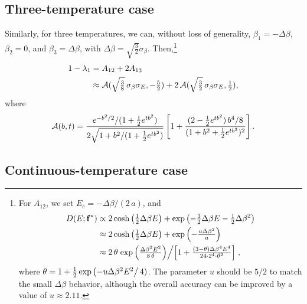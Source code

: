 \documentclass[reprint,aip,jcp,superscriptaddress]{revtex4-1}
\begin{document}
\subsection{Three-temperature case}



Similarly,
for three  temperatures,
we can, without loss of generality,
$\beta_1 = -\Delta \beta$,
$\beta_2 = 0$,
and
$\beta_3 = \Delta \beta$,
with
$\Delta \beta = \sqrt{\frac 3 2} \sigma_\beta$.
%
Then,\footnote{
%
For $A_{12}$,
we set $E_c = -\Delta \beta/(2 \, a)$,
and
\begin{align*}
D(E; \mathbf{f}^*)
&\propto
2 \cosh\left(
  \tfrac{1}{2} \Delta \beta E
\right)
+
\exp\left(
  -\tfrac{3}{2} \Delta \beta E
  -\tfrac{1}{2} \Delta \beta^2
\right)
\\
&\approx
2 \cosh\left(
  \tfrac{1}{2} \Delta \beta E
\right)
+
\exp\left(
  -\tfrac{ u \Delta \beta^2 }{ a }
\right)
\\
&\approx
2 \, \theta
\left.
  \exp\left(
    \tfrac{\Delta \beta^2 E^2} { 8 \, \theta }
  \right)
\middle/
  \left[
    1
    +
    \tfrac{ (3 - \theta) \Delta \beta^4 E^4 }
    { 24 \cdot 2^4 \cdot \theta^2 }
  \right]
\right.,
\end{align*}
where
$\theta = 1 + \frac 1 2 \exp\left(-u \Delta \beta^2 E^2\right/4)$.
%
The parameter $u$ should be $5/2$
to match the small $\Delta \beta$ behavior,
although the overall accuracy can be improved
by a value of $u \approx 2.11$.
}
%
\begin{align}
1 - \lambda_1
&= A_{12} + 2 A_{13}
\notag \\
&\approx
\mathcal{A}(\sqrt{\tfrac 3 8} \, \sigma_\beta \sigma_E, -\tfrac 5 2)
+
2 \, \mathcal{A}(\sqrt{\tfrac 3 2} \, \sigma_\beta \sigma_E, \tfrac 1 2),
\label{eq:lambda1_threeT}
\end{align}
where
\begin{align*}
\mathcal{A}(b, t)
=
\frac{
  e^{-b^2/2} / (1 + \frac{1}{2}e^{tb^2})
}
{
  2 \sqrt{1 + b^2/(1 + \frac{1}{2} e^{tb^2})}
}
\left[
  1
  +
  \frac{(2 - \frac{1}{2} e^{tb^2}) \, b^4/8}
  { (1 + b^2 + \frac{1}{2} e^{tb^2})^2 }
\right].
\end{align*}




\subsection{Continuous-temperature case}
\end{document}
